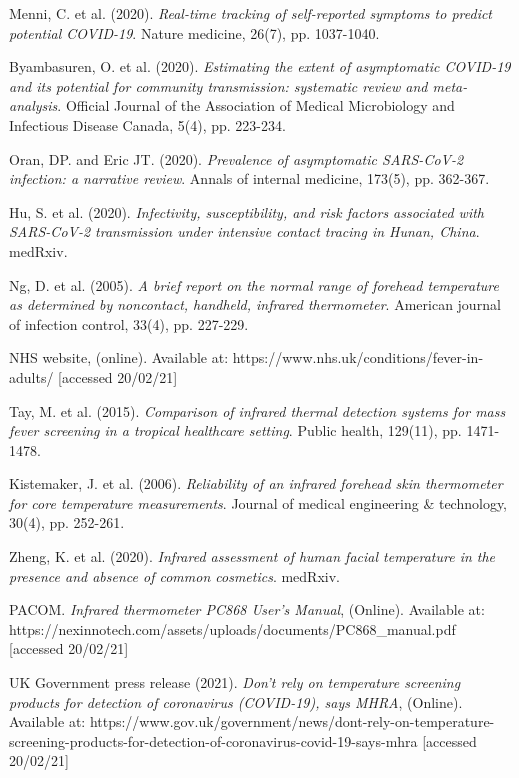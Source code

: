 \documentclass[11pt]{report}
\begin{document}
\begin{thebibliography}{1}
        Menni, C. et al. (2020). \emph{Real-time tracking of self-reported symptoms to predict potential COVID-19}. Nature medicine, 26(7), pp. 1037-1040.

        Byambasuren, O. et al. (2020). \emph{Estimating the extent of asymptomatic COVID-19 and its potential for community transmission: systematic review and meta-analysis}. Official Journal of the Association of Medical Microbiology and Infectious Disease Canada, 5(4), pp. 223-234.

        Oran, DP. and Eric JT. (2020). \emph{Prevalence of asymptomatic SARS-CoV-2 infection: a narrative review}. Annals of internal medicine, 173(5), pp. 362-367.

        Hu, S. et al. (2020). \emph{Infectivity, susceptibility, and risk factors associated with SARS-CoV-2 transmission under intensive contact tracing in Hunan, China}. medRxiv.

        Ng, D. et al. (2005). \emph{A brief report on the normal range of forehead temperature as determined by noncontact, handheld, infrared thermometer}. American journal of infection control, 33(4), pp. 227-229.

        NHS website, (online). Available at: https://www.nhs.uk/conditions/fever-in-adults/ [accessed 20/02/21]

        Tay, M. et al. (2015). \emph{Comparison of infrared thermal detection systems for mass fever screening in a tropical healthcare setting}. Public health, 129(11), pp. 1471-1478.

        Kistemaker, J. et al. (2006). \emph{Reliability of an infrared forehead skin thermometer for core temperature measurements}. Journal of medical engineering \& technology, 30(4), pp. 252-261.

        Zheng, K. et al. (2020). \emph{Infrared assessment of human facial temperature in the presence and absence of common cosmetics}. medRxiv.

        PACOM. \emph{Infrared thermometer PC868 User's Manual}, (Online). Available at: https://nexinnotech.com/assets/uploads/documents/PC868\_manual.pdf [accessed 20/02/21]

        UK Government press release (2021). \emph{Don’t rely on temperature screening products for detection of coronavirus (COVID-19), says MHRA}, (Online). Available at: https://www.gov.uk/government/news/dont-rely-on-temperature-screening-products-for-detection-of-coronavirus-covid-19-says-mhra [accessed 20/02/21]
 

\end{thebibliography}
\end{document}
